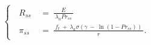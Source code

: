 \begin{equation}
    \begin{cases}
        \begin{split}
        \ R_{ss} \
        & = \ \frac{E}{ \ \lambda_{a} Pr_{ss} \ } \\
        \ \pi_{ss} \
        & = \ \frac{ \ f_{t} \ + \ \lambda_{a} \sigma \left( \gamma \ - \ \ln(1 - Pr_{ss}) \right) \ }{r}.
        \end{split}
    \end{cases}
\label{Equation:Social-Planners-Problem_System-of-Equations-for-Steady-State}
\end{equation}